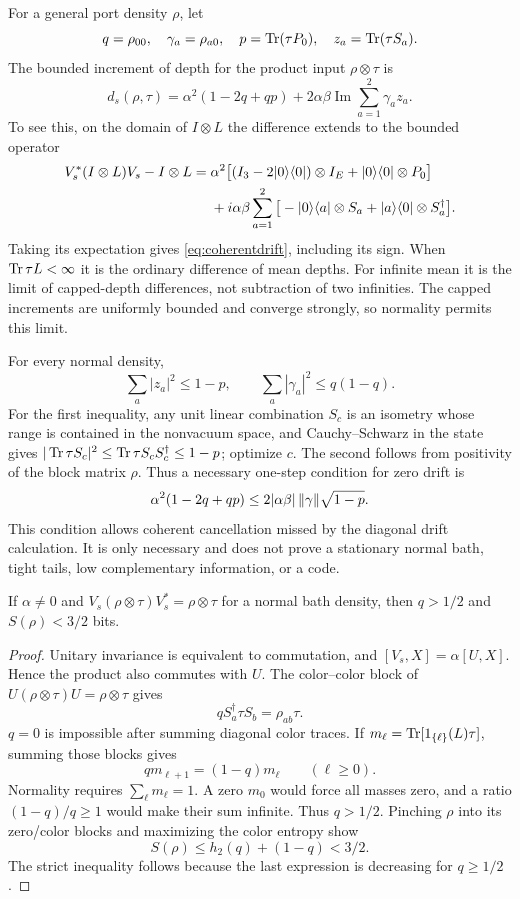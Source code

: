 For a general port density $\rho$, let
\[
 q=\rho_{00},\quad \gamma_a=\rho_{a0},\quad
 p=\operatorname{Tr}(\tau P_0),\quad z_a=\operatorname{Tr}(\tau S_a).
\]
The bounded increment of depth for the product input $\rho\otimes\tau$ is
\begin{equation}
 d_s(\rho,\tau)=\alpha^2(1-2q+qp)
 +2\alpha\beta\operatorname{Im}\sum_{a=1}^2\gamma_a z_a.
 \label{eq:coherentdrift}
\end{equation}
To see this, on the domain of $I\otimes L$ the difference extends to the bounded operator
\begin{align*}
 V_s^*(I\otimes L)V_s-I\otimes L
 ={}&\alpha^2\big[(I_3-2\lvert 0\rangle\langle 0\rvert)\otimes I_E+\lvert 0\rangle\langle 0\rvert\otimes P_0\big]\\
 &+i\alpha\beta\sum_{a=1}^2
 \big[-\lvert 0\rangle\langle a\rvert\otimes S_a+\lvert a\rangle\langle 0\rvert\otimes S_a^\dagger\big].
\end{align*}
Taking its expectation gives \eqref{eq:coherentdrift}, including its sign. When $\operatorname{Tr}\tau L<\infty$ it is the ordinary difference of mean depths. For infinite mean it is the limit of capped-depth differences, not subtraction of two infinities. The capped increments are uniformly bounded and converge strongly, so normality permits this limit.

For every normal density,
\[
 \sum_a|z_a|^2\le1-p,\qquad
 \sum_a|\gamma_a|^2\le q(1-q).
\]
For the first inequality, any unit linear combination $S_c$ is an isometry whose range is contained in the nonvacuum space, and Cauchy--Schwarz in the state gives $|\operatorname{Tr}\tau S_c|^2\le\operatorname{Tr}\tau S_cS_c^\dagger\le1-p$; optimize $c$. The second follows from positivity of the block matrix $\rho$. Thus a necessary one-step condition for zero drift is
\begin{equation}
 \alpha^2(1-2q+qp)\le2|\alpha\beta|\,\lVert \gamma\rVert\sqrt{1-p}.
 \label{eq:necessarydrift}
\end{equation}
This condition allows coherent cancellation missed by the diagonal drift calculation. It is only necessary and does not prove a stationary normal bath, tight tails, low complementary information, or a code.

\begin{proposition}\label{prop:product}
If $\alpha\ne0$ and $V_s(\rho\otimes\tau)V_s^*=\rho\otimes\tau$ for a normal bath density, then $q>1/2$ and $S(\rho)<3/2$ bits.
\end{proposition}
\begin{proof}
Unitary invariance is equivalent to commutation, and $[V_s,X]=\alpha[U,X]$. Hence the product also commutes with $U$. The color--color block of $U(\rho\otimes\tau)U=\rho\otimes\tau$ gives
\[
 qS_a^\dagger\tau S_b=\rho_{ab}\tau.
\]
$q=0$ is impossible after summing diagonal color traces. If $m_\ell=\operatorname{Tr}[1_{\{\ell\}}(L)\tau]$, summing those blocks gives
\[
 q m_{\ell+1}=(1-q)m_\ell\qquad(\ell\ge0).
\]
Normality requires $\sum_\ell m_\ell=1$. A zero $m_0$ would force all masses zero, and a ratio $(1-q)/q\ge1$ would make their sum infinite. Thus $q>1/2$. Pinching $\rho$ into its zero/color blocks and maximizing the color entropy show
\[
 S(\rho)\le h_2(q)+(1-q)<3/2.
\]
The strict inequality follows because the last expression is decreasing for $q\ge1/2$.
\end{proof}

